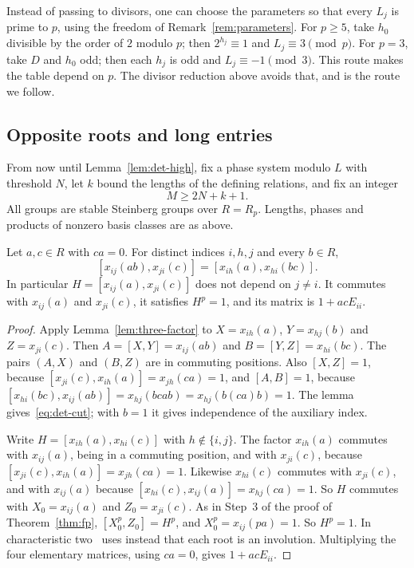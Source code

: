 \begin{remark}\label{rem:det-coprime}
Instead of passing to divisors, one can choose the parameters so that every $L_j$ is prime to $p$, using the freedom of
Remark~\ref{rem:parameters}. For $p\geq5$, take $h_0$ divisible by the order of $2$ modulo $p$; then
$2^{h_j}\equiv1$ and $L_j\equiv3\pmod p$. For $p=3$, take $D$ and $h_0$ odd; then each $h_j$ is odd and
$L_j\equiv-1\pmod3$. This route makes the table depend on $p$. The divisor reduction above avoids that, and is the route
we follow.
\end{remark}

\subsection{Opposite roots and long entries}

From now until Lemma~\ref{lem:det-high}, fix a phase system modulo $L$ with threshold $N$, let $k$ bound the lengths of
the defining relations, and fix an integer
\[
 M\geq2N+k+1.
\]
All groups are stable Steinberg groups over $R=R_p$. Lengths, phases and products of nonzero basis classes are as above.

\begin{lemma}\label{lem:det-opposite}
Let $a,c\in R$ with $ca=0$. For distinct indices $i,h,j$ and every $b\in R$,
\begin{equation}\label{eq:det-cut}
 [x_{ij}(ab),x_{ji}(c)]=[x_{ih}(a),x_{hi}(bc)].
\end{equation}
In particular $H=[x_{ij}(a),x_{ji}(c)]$ does not depend on $j\neq i$. It commutes with $x_{ij}(a)$ and $x_{ji}(c)$, it
satisfies $H^p=1$, and its matrix is $1+acE_{ii}$.
\end{lemma}

\begin{proof}
Apply Lemma~\ref{lem:three-factor} to $X=x_{ih}(a)$, $Y=x_{hj}(b)$ and $Z=x_{ji}(c)$. Then $A=[X,Y]=x_{ij}(ab)$ and
$B=[Y,Z]=x_{hi}(bc)$. The pairs $(A,X)$ and $(B,Z)$ are in commuting positions. Also $[X,Z]=1$, because
$[x_{ji}(c),x_{ih}(a)]=x_{jh}(ca)=1$, and $[A,B]=1$, because $[x_{hi}(bc),x_{ij}(ab)]=x_{hj}(bcab)=x_{hj}(b(ca)b)=1$. The
lemma gives~\eqref{eq:det-cut}; with $b=1$ it gives independence of the auxiliary index.

Write $H=[x_{ih}(a),x_{hi}(c)]$ with $h\notin\{i,j\}$. The factor $x_{ih}(a)$ commutes with $x_{ij}(a)$, being in a
commuting position, and with $x_{ji}(c)$, because $[x_{ji}(c),x_{ih}(a)]=x_{jh}(ca)=1$. Likewise $x_{hi}(c)$ commutes with
$x_{ji}(c)$, and with $x_{ij}(a)$ because $[x_{hi}(c),x_{ij}(a)]=x_{hj}(ca)=1$. So $H$ commutes with $X_0=x_{ij}(a)$ and
$Z_0=x_{ji}(c)$. As in Step~3 of the proof of Theorem~\ref{thm:fp}, $[X_0^p,Z_0]=H^p$, and $X_0^p=x_{ij}(pa)=1$. So
$H^p=1$. In characteristic two~\cite{OAI247rf} uses instead that each root is an involution. Multiplying the four
elementary matrices, using $ca=0$, gives $1+acE_{ii}$.
\end{proof}

